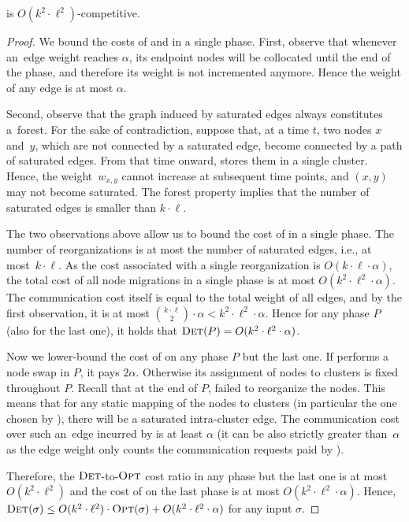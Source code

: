 \begin{theorem}
\DET is $O(k^2 \cdot \ell^2)$-competitive.
\end{theorem}

\begin{proof}
We bound the costs of \DET and \OPT in a single phase. First, observe that
whenever an~edge weight reaches $\alpha$, its endpoint nodes will be collocated 
until the end of the phase, and therefore its weight is not
incremented anymore. Hence the weight of any edge is at most $\alpha$.

Second, observe that the graph induced by saturated edges always constitutes 
a~forest. For the sake of contradiction, suppose that, at a time $t$,
two nodes $x$ and~$y$, which are not
connected by a saturated edge, become connected by a path of saturated edges.
From that time onward, \DET stores them in a single cluster. Hence, the
weight~$w_{x,y}$ cannot increase at subsequent time points, and $(x,y)$ may
not become saturated. The forest property implies that the number of saturated
edges is smaller than $k \cdot \ell$.

The two observations above allow us to bound the cost of \DET in a single
phase. The number of reorganizations is at most the number of saturated edges,
i.e., at most~$k \cdot \ell$. As the cost associated with a single
reorganization is $O(k \cdot \ell \cdot \alpha)$, the total cost of all node
migrations in a single phase is at most $O(k^2 \cdot \ell^2 \cdot \alpha)$.
The communication cost itself is equal to the total weight of all edges, and
by the first observation, it is at most $\binom{k \cdot \ell}{2}
\cdot \alpha < k^2 \cdot \ell^2 \cdot \alpha$. Hence for any phase $P$ (also
for the last one), it holds that $\textsc{Det}(P) = O(k^2 \cdot \ell^2 \cdot \alpha)$.

Now we lower-bound the cost of \OPT on any phase $P$ but the last one. If \OPT
performs a node swap in $P$, it pays $2 \alpha$. Otherwise its assignment of
nodes to clusters is fixed throughout $P$. Recall that at the end of $P$, \DET
failed to reorganize the nodes. This means that for any static mapping of the
nodes to clusters (in particular the one chosen by \OPT), there will be a
saturated intra-cluster edge. The communication cost over such an~edge incurred
by \OPT is at least $\alpha$ (it can be also strictly greater than~$\alpha$ as
the edge weight only counts the communication requests paid by \DET).

Therefore, the $\textsc{Det}$-to-$\textsc{Opt}$ cost ratio in any phase but the last one is at
most $O(k^2 \cdot \ell^2)$ and the cost of \DET on the last phase is at
most $O(k^2 \cdot \ell^2 \cdot \alpha)$. Hence,
$\textsc{Det}(\sigma) \leq O(k^2 \cdot \ell^2) \cdot \textsc{Opt}(\sigma) + O(k^2 \cdot
\ell^2 \cdot \alpha)$ for any input $\sigma$.
\end{proof}


